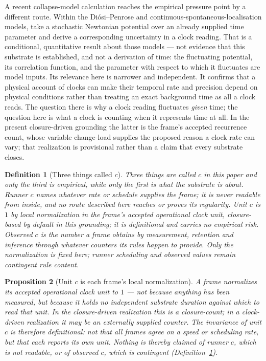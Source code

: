 \documentclass[11pt,a4paper]{article}
\newtheorem{definition}{Definition}[section]
\newtheorem{proposition}[definition]{Proposition}
\theoremstyle{remark}\newtheorem{remark}[definition]{Remark}
\begin{document}
A recent collapse-model calculation reaches the empirical pressure point by a different route.
Within the Diósi--Penrose and continuous-spontaneous-localisation models, \citet{bortolotti2025}
take a stochastic Newtonian potential over an already supplied time parameter and derive a
corresponding uncertainty in a clock reading. That is a conditional, quantitative result about
those models --- not evidence that this substrate is established, and not a derivation of time:
the fluctuating potential, its correlation function, and the parameter with respect to which it
fluctuates are model inputs. Its relevance here is narrower and independent. It confirms that a
physical account of clocks can make their temporal rate and precision depend on physical
conditions rather than treating an exact background time as all a clock reads. The question there
is why a clock reading fluctuates \emph{given} time; the question here is what a clock is counting
when it represents time at all. In the present closure-driven grounding the latter is the frame's
accepted recurrence count, whose variable change-load supplies the proposed reason a clock rate can
vary; that realization is provisional rather than a claim that every substrate closes.

\begin{definition}[Three things called $c$]\label{def:three-c}
Three things are called $c$ in this paper and only the third is empirical, while
only the first is what the substrate is about. \emph{Runner $c$} names whatever rate or schedule supplies the frame; it is never
readable from inside, and no route described here reaches or proves its regularity. \emph{Unit $c$}
is $1$ by local normalization in the frame's accepted operational clock unit, closure-based by
default in this grounding; it is definitional and carries no empirical risk. \emph{Observed $c$} is
the number a frame obtains by measurement, retention and inference through whatever counters its rules
happen to provide. Only the normalization is fixed here; runner scheduling and observed values remain
contingent rule content.
\end{definition}

\begin{proposition}[Unit $c$ is each frame's local normalization]\label{prop:c-unit}
A frame normalizes its accepted operational clock unit to $1$ --- not because
anything has been measured, but because it holds no independent substrate duration
against which to read that unit. In the closure-driven realization this is a
closure-count; in a clock-driven realization it may be an externally supplied
counter. The invariance of \emph{unit} $c$ is therefore definitional: not that all
frames agree on a speed or scheduling rate, but that each reports its own unit.
Nothing is thereby claimed of runner $c$, which is not readable, or of observed
$c$, which is contingent (Definition~\ref{def:three-c}).
\end{proposition}
\end{document}
